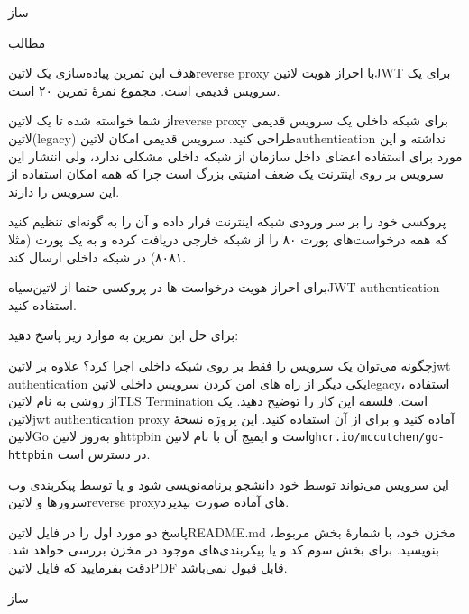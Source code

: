 \documentclass{../assignment}
\begin{document}
‌ساز

‌مطالب


هدف این تمرین پیاده‌سازی یک ‌لاتین{reverse proxy} با احراز هویت ‌لاتین{JWT} برای یک سرویس قدیمی است.
مجموع نمرهٔ تمرین ۲۰ است.



از شما خواسته شده تا یک ‌لاتین{reverse proxy} برای شبکه داخلی یک سرویس قدیمی ‌لاتین{(legacy)} طراحی کنید.
سرویس قدیمی امکان ‌لاتین{authentication} نداشته و این مورد برای استفاده اعضای داخل سازمان از شبکه داخلی مشکلی ندارد، ولی انتشار این سرویس بر روی اینترنت یک ضعف امنیتی بزرگ است چرا که همه امکان استفاده از این سرویس را دارند.

پروکسی خود را بر سر ورودی شبکه اینترنت قرار داده و آن را به گونه‌ای تنظیم کنید که همه درخواست‌های پورت ۸۰ را از شبکه خارجی دریافت کرده و به یک پورت (مثلا ۸۰۸۱) در شبکه داخلی ارسال کند.

برای احراز هویت درخواست ها در پروکسی حتما از ‌لاتین{‌سیاه{JWT authentication}} استفاده کنید.

برای حل این تمرین به موارد زیر پاسخ دهید:

 چگونه می‌توان یک سرویس را فقط بر روی شبکه داخلی اجرا کرد؟ 
 علاوه بر ‌لاتین{jwt authentication} یکی دیگر از راه های امن کردن سرویس داخلی ‌لاتین{legacy}، استفاده از روشی به نام ‌لاتین{TLS Termination} است. فلسفه این کار را توضیح دهید. 
 یک ‌لاتین{jwt authentication proxy} آماده کنید و برای  از آن استفاده کنید. این پروژه نسخهٔ ‌لاتین{Go} و به‌روز ‌لاتین{httpbin} است و ایمیج آن با نام ‌لاتین{\texttt{ghcr.io/mccutchen/go-httpbin}} در دسترس است. 

این سرویس می‌تواند توسط خود دانشجو برنامه‌نویسی شود و یا توسط پیکربندی وب سرورها و ‌لاتین{reverse proxy}های آماده صورت بپذیرد.


پاسخ دو مورد اول را در فایل ‌لاتین{README.md} مخزن خود، با شمارهٔ بخش مربوط، بنویسید. برای بخش سوم کد و یا پیکربندی‌های موجود در مخزن بررسی خواهد شد.
دقت بفرمایید که فایل ‌لاتین{PDF} قابل قبول نمی‌باشد.


‌ساز
\end{document}
